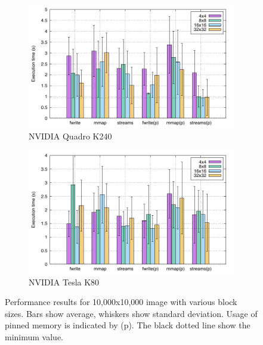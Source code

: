 \documentclass{article}
\begin{document}
\begin{figure}
    \begin{subfigure}{\linewidth}
        \includegraphics{../fig/sm30-10000.pdf}
        \caption{NVIDIA Quadro K240}
    \end{subfigure}
    \begin{subfigure}{\linewidth}
        \includegraphics{../fig/sm37-10000.pdf}
        \caption{NVIDIA Tesla K80}
    \end{subfigure}
    \caption{Performance results for 10,000x10,000 image with various block
    sizes. Bars show average, whiskers show standard deviation. Usage of pinned
    memory is indicated by (p). The black dotted line show the minimum value.}
    \label{fig:10000}
\end{figure}
\end{document}
